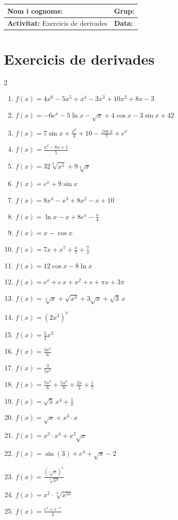 \documentclass[12pt,a4paper]{article}
\begin{document}
\begingroup
\renewcommand{\arraystretch}{2.2}
\begin{tabularx}{\textwidth}{|X|p{4cm}|}
\hline
\textbf{Nom i cognoms:} & \textbf{Grup:} \\ \hline
\textbf{Activitat:} Exercicis de derivades & \textbf{Data:} \\ \hline
\end{tabularx}
\endgroup

\vspace{0.5cm}

\section*{Exercicis de derivades}

\begin{multicols}{2}
\begin{enumerate}
    \item $f(x) = 4x^6 - 5x^5 + x^4 - 3x^3 + 10x^2 + 8x - 3$
    \item $f(x) = -6e^x - 5\ln x - \sqrt{x} + 4\cos x - 3\sin x + 42$
    \item $f(x) = 7\sin x + \frac{x^6}{3} + 10 - \frac{\cos x}{7} + e^x$
    \item $f(x) = \frac{x^2 - 8x + 1}{5}$
    \item $f(x) = 32\sqrt[8]{x^5} + 9\sqrt[3]{x}$
    \item $f(x) = e^x + 9\sin x$
    \item $f(x) = 8x^4 - x^3 + 8x^2 - x + 10$
    \item $f(x) = \ln x - x + 8e^x - \frac{x}{4}$
    \item $f(x) = x - \cos x$
    \item $f(x) = 7x + x^7 + \frac{x}{7} + \frac{7}{x}$
    \item $f(x) = 12\cos x - 8\ln x$
    \item $f(x) = e^x + e\,x + x^2 + e + \pi x + 3\pi$
    \item $f(x) = \sqrt[3]{x} + \sqrt{x^3} + 3\sqrt{x} + \sqrt{3}\,x$
    \item $f(x) = \left(2x^3\right)^7$
    \item $f(x) = \frac{5}{2}x^3$
    \item $f(x) = \frac{3x^4}{6}$
    \item $f(x) = \frac{3}{5x^3}$
    \item $f(x) = \frac{7x^3}{6} + \frac{5x^2}{8} + \frac{2x}{5} + \frac{1}{7}$
    \item $f(x) = \sqrt{5}\,x^4 + \frac{1}{x}$
    \item $f(x) = \sqrt{x} + x^3 \cdot x$
    \item $f(x) = x^3 \cdot x^4 + x^3\sqrt{x}$
    \item $f(x) = \sin(3) + e^4 + \sqrt{\pi} - 2$
    \item $f(x) = \frac{(\sqrt[5]{x})^3}{\sqrt[3]{x^2}}$
    \item $f(x) = x^2 \cdot \sqrt[3]{x^{12}}$
    \item $f(x) = \frac{e^x + e^{-x}}{2}$
\end{enumerate}
\end{multicols}
\end{document}
